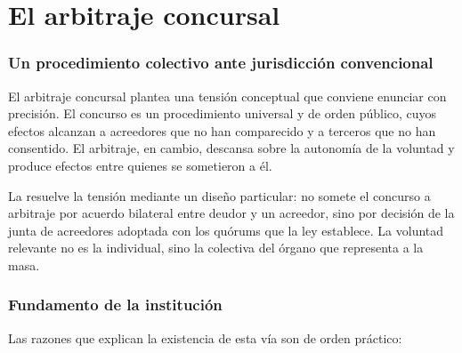 \chapter{El arbitraje concursal}
\label{cap:arbitraje}


\bloqueTeorico

\subsection{Un procedimiento colectivo ante jurisdicción convencional}

El arbitraje concursal plantea una tensión conceptual que conviene enunciar con
precisión. El concurso es un procedimiento universal y de orden público, cuyos efectos
alcanzan a acreedores que no han comparecido y a terceros que no han consentido. El
arbitraje, en cambio, descansa sobre la autonomía de la voluntad y produce efectos entre
quienes se sometieron a él.

La \LIR{} \citeyearpar{ley-20720} resuelve la tensión mediante un diseño particular: no
somete el concurso a arbitraje por acuerdo bilateral entre deudor y un acreedor, sino por
decisión de la junta de acreedores adoptada con los quórums que la ley
establece. La voluntad relevante no es la individual, sino la
colectiva del órgano que representa a la masa.

\subsection{Fundamento de la institución}

Las razones que explican la existencia de esta vía son de orden práctico:

